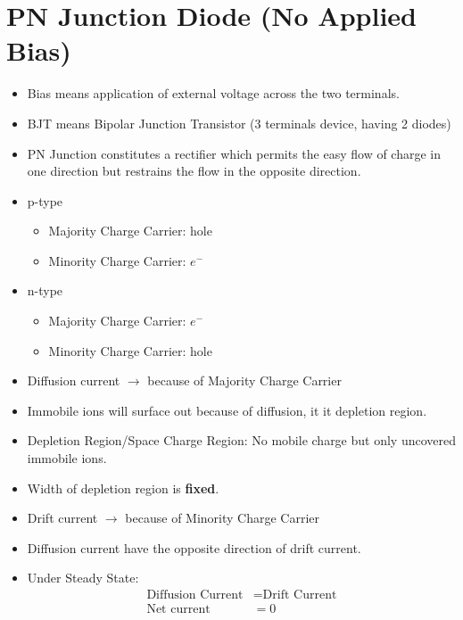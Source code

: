 \documentclass[a4aper,12pt]{report}
\begin{document}
\section{PN Junction Diode (No Applied Bias)}
\begin{itemize}
    \item Bias means application of external voltage across the two terminals. 
    \item BJT means Bipolar Junction Transistor (3 terminals device, having 2 diodes)
    \item PN Junction constitutes a rectifier which permits the easy flow of charge in one direction but restrains the flow in the opposite direction. 
    \item p-type
    \begin{itemize}
        \item Majority Charge Carrier: hole
        \item Minority Charge Carrier: $e^-$
    \end{itemize}
    \item n-type
    \begin{itemize}
        \item Majority Charge Carrier: $e^-$
        \item Minority Charge Carrier: hole
    \end{itemize}
    \item Diffusion current $\longrightarrow$ because of Majority Charge Carrier 
    \item Immobile ions will surface out because of diffusion, it it depletion region. 
    \item Depletion Region/Space Charge Region: No mobile charge but only uncovered immobile ions. 
    \item Width of depletion region is \textbf{fixed}.
    \item Drift current $\longrightarrow$ because of Minority Charge Carrier 
    \item Diffusion current have the opposite direction of drift current.
    \item Under Steady State: \begin{align*}
        \text{Diffusion Current} &= \text{Drift Current} \\ 
        \text{Net current } &= 0
    \end{align*}
\end{itemize}
\end{document}

